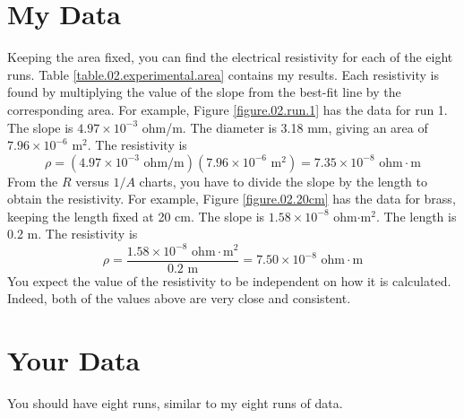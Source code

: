 \section{My Data}
Keeping the area fixed, you can find the electrical resistivity for each of the eight runs. Table \ref{table.02.experimental.area} contains my results. Each resistivity is found by multiplying the value of the slope from the best-fit line by the corresponding area. For example, Figure \ref{figure.02.run.1} has the data for run 1. The slope is $4.97 \times 10^{-3}$ ohm/m. The diameter is 3.18 mm, giving an area of $7.96 \times 10^{-6}$ m$^{2}$. The resistivity is
\begin{equation}
	\rho = \left(4.97 \times 10^{-3} \text{ ohm/m}\right) \left(7.96 \times 10^{-6} \text{ m}^{2}\right) = 7.35 \times 10^{-8} \text{ ohm}\cdot\text{m}
\end{equation}
From the $R$ versus $1/A$ charts, you have to divide the slope by the length to obtain the resistivity. For example, Figure \ref{figure.02.20cm} has the data for brass, keeping the length fixed at 20 cm. The slope is $1.58 \times 10^{-8}$ ohm$\cdot$m$^{2}$. The length is 0.2 m. The resistivity is
\begin{equation}
	\rho = \frac{1.58 \times 10^{-8} \text{ ohm}\cdot\text{m}^{2}}{0.2 \text{ m}} = 7.50 \times 10^{-8} \text{ ohm}\cdot\text{m}
\end{equation}
You expect the value of the resistivity to be independent on how it is calculated. Indeed, both of the values above are very close and consistent.
\section{Your Data}
You should have eight runs, similar to my eight runs of data.
\newpage
